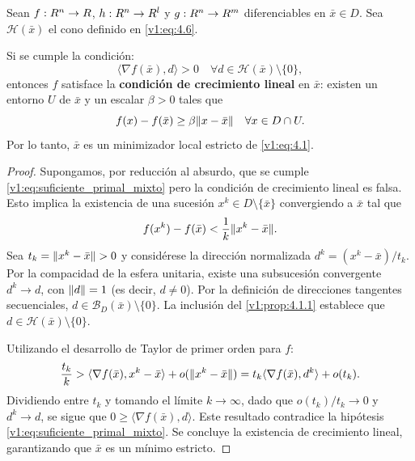 \begin{theorem}\label{v1:thm:4.1.1}
 Sean $f : R^n \to R$, $h : R^n \to R^l$ y $g : R^n \to R^m$ diferenciables en $\bar{x} \in D$. Sea $\mathcal{H}(\bar{x})$ el cono definido en \eqref{v1:eq:4.6}.
 
 Si se cumple la condición:
 \begin{equation}
 \langle \nabla f(\bar{x}), d \rangle > 0 \quad \forall d \in \mathcal{H}(\bar{x}) \setminus \{0\},
 \label{v1:eq:suficiente_primal_mixto}
 \end{equation}
 entonces $f$ satisface la \textbf{condición de crecimiento lineal} en $\bar{x}$: existen un entorno $U$ de $\bar{x}$ y un escalar $\beta > 0$ tales que
 \[
 f(x) - f(\bar{x}) \ge \beta \lVert x - \bar{x}\rVert \quad \forall x \in D \cap U.
 \]
 Por lo tanto, $\bar{x}$ es un minimizador local estricto de \eqref{v1:eq:4.1}.
\end{theorem}

\begin{proof}
 Supongamos, por reducción al absurdo, que se cumple \eqref{v1:eq:suficiente_primal_mixto} pero la condición de crecimiento lineal es falsa. Esto implica la existencia de una sucesión $x^k \in D \setminus \{\bar{x}\}$ convergiendo a $\bar{x}$ tal que
 \[
 f(x^k) - f(\bar{x}) < \frac{1}{k} \lVert x^k - \bar{x}\rVert.
 \]
 Sea $t_k = \lVert x^k - \bar{x}\rVert > 0$ y considérese la dirección normalizada $d^k = (x^k - \bar{x})/t_k$. Por la compacidad de la esfera unitaria, existe una subsucesión convergente $d^k \to d$, con $\lVert d\rVert = 1$ (es decir, $d \neq 0$). Por la definición de direcciones tangentes secuenciales, $d \in \mathcal{B}_D(\bar{x}) \setminus \{0\}$. La inclusión del \cref{v1:prop:4.1.1} establece que $d \in \mathcal{H}(\bar{x}) \setminus \{0\}$.
 
 Utilizando el desarrollo de Taylor de primer orden para $f$:
 \[
 \frac{t_k}{k} > \langle \nabla f(\bar{x}), x^k - \bar{x} \rangle + o(\lVert x^k - \bar{x}\rVert) = t_k \langle \nabla f(\bar{x}), d^k \rangle + o(t_k).
 \]
 Dividiendo entre $t_k$ y tomando el límite $k \to \infty$, dado que $o(t_k)/t_k \to 0$ y $d^k \to d$, se sigue que $0 \ge \langle \nabla f(\bar{x}), d \rangle$. Este resultado contradice la hipótesis \eqref{v1:eq:suficiente_primal_mixto}. Se concluye la existencia de crecimiento lineal, garantizando que $\bar{x}$ es un mínimo estricto.
\end{proof}

